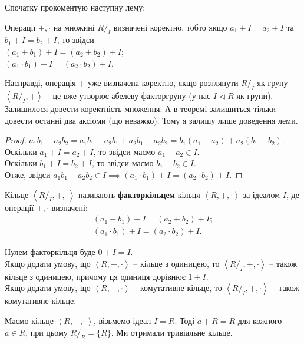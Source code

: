 \documentclass{math_library}
\begin{document}
Спочатку прокоментую наступну лему:
\begin{lemma}
Операції $+,\cdot$ на множині $R/_I$ визначені коректно, тобто якщо $a_1+I = a_2+I$ та $b_1+I = b_2+I$, то звідси \\
$(a_1+b_1) + I = (a_2+b_2) + I$;\\
$(a_1 \cdot b_1) + I = (a_2 \cdot b_2) + I$.
\end{lemma}

Насправді, операція $+$ уже визначена коректно, якщо розглянути $R/_I$ як групу $\left<R/_I, + \right>$ -- це вже утворює абелеву факторгрупу (у нас $I \triangleleft R$ як групи). Залишилося довести коректність множення. А в теоремі залишиться тільки довести останні два аксіоми (що неважко). Тому я залишу лише доведення леми.

\begin{proof}
$a_1b_1 - a_2b_2 = a_1b_1 - a_2b_1 + a_2b_1 - a_2b_2 = b_1(a_1 - a_2) + a_2(b_1 - b_2)$.\\
Оскільки $a_1 + I = a_2 + I$, то звідси маємо $a_1 - a_2 \in I$.\\
Оскільки $b_1 + I = b_2 + I$, то звідси маємо $b_1 - b_2 \in I$.\\
Отже, звідси $a_1b_1 - a_2b_2 \in I \implies (a_1 \cdot b_1) + I = (a_2 \cdot b_2) + I$.
\end{proof}

\begin{definition}
Кільце $\left<R/_I,+,\cdot \right>$ називають \textbf{факторкільцем} кільця $\left<R,+,\cdot \right>$ за ідеалом $I$, де операції $+, \cdot$ визначені:
\begin{align*}
(a_1+b_1) + I = (a_2+b_2) + I;\\
(a_1 \cdot b_1) + I = (a_2 \cdot b_2) + I.
\end{align*}
\end{definition}

\begin{remark}
Нулем факторкільця буде $0+I = I$.\\
Якщо додати умову, що $\left< R, + ,\cdot \right>$ -- кільце з одиницею, то $\left< R/_I, + ,\cdot \right>$ -- також кільце з одиницею, причому ця одиниця дорівнює $1 + I$.\\
Якщо додати умову, що $\left< R, + ,\cdot \right>$ -- комутативне кільце, то $\left< R/_I, + ,\cdot \right>$ -- також комутативне кільце.
\end{remark}

\begin{example}
Маємо кільце $\left<R,+,\cdot \right>$, візьмемо ідеал $I = R$. Тоді $a+R = R$ для кожного $a \in R$, при цьому $R/_R = \{R\}$. Ми отримали тривіальне кільце.
\end{example}
\end{document}
